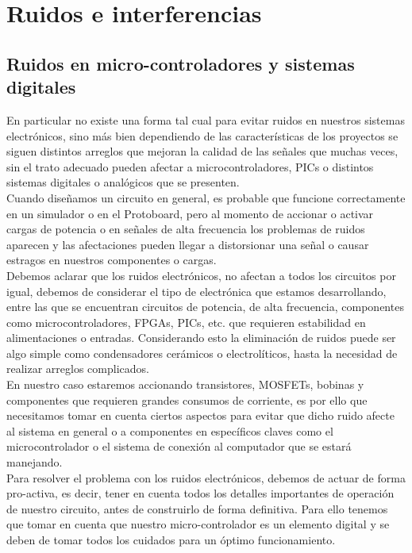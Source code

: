 \newpage
\section{Ruidos e interferencias}
\subsection{Ruidos en micro-controladores y sistemas digitales}

En particular no existe una forma tal cual para evitar ruidos en nuestros sistemas electrónicos, sino más bien dependiendo de las características de los proyectos se siguen distintos arreglos que mejoran la calidad de las señales que muchas veces, sin el trato adecuado pueden afectar a microcontroladores, PICs o distintos sistemas digitales o analógicos que se presenten. \\

Cuando diseñamos un circuito en general, es probable que funcione correctamente en un simulador o en el Protoboard, pero al momento de accionar o activar cargas de potencia o en señales de alta frecuencia los problemas de ruidos aparecen y las afectaciones pueden llegar a distorsionar una señal o causar estragos en nuestros componentes o cargas.\\

Debemos aclarar que los ruidos electrónicos, no afectan a todos los circuitos por igual, debemos de considerar el tipo de electrónica que estamos desarrollando, entre las que se encuentran circuitos de potencia, de alta frecuencia, componentes como microcontroladores, FPGAs, PICs, etc. que requieren estabilidad en alimentaciones o entradas. Considerando esto la eliminación de ruidos puede ser algo simple como condensadores cerámicos o electrolíticos, hasta la necesidad de realizar arreglos complicados.\\

En nuestro caso estaremos accionando transistores, MOSFETs, bobinas y componentes que requieren grandes consumos de corriente, es por ello que necesitamos tomar en cuenta ciertos aspectos para evitar que dicho ruido afecte al sistema en general o a componentes en específicos claves como el microcontrolador o el sistema de conexión al computador que se estará manejando.\\

Para resolver el problema con los ruidos electrónicos, debemos de actuar de forma pro-activa, es decir, tener en cuenta todos los detalles importantes de operación de nuestro circuito, antes de construirlo de forma definitiva. Para ello tenemos que tomar en cuenta que nuestro micro-controlador es un elemento digital y se deben de tomar todos los cuidados para un óptimo funcionamiento.\\

